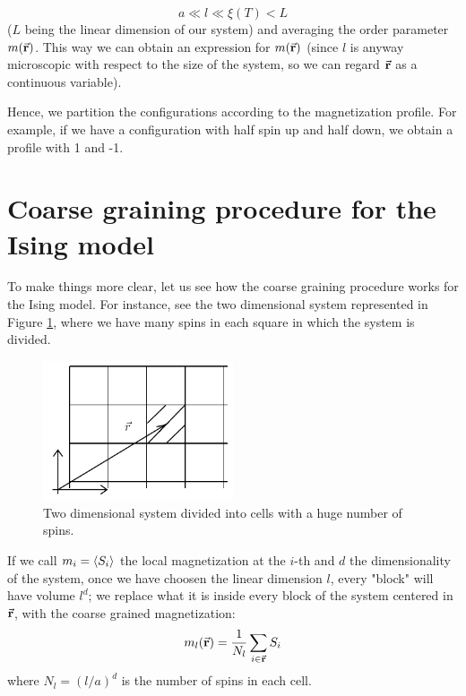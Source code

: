 \documentclass[../../Main/Main.tex]{subfiles}
\begin{document}
\begin{equation}
  a \ll l \ll \xi (T) < L
  \label{eq:17_1}
\end{equation}
(\( L \)  being the linear dimension of our system) and averaging the order parameter  \( m(\va{r}) \).  This way we can obtain an expression for \( m(\va{r}) \) (since \( l \) is anyway microscopic with respect to the size of the system, so we can regard  \( \va{r} \) as a continuous variable).

\begin{remark}
Hence, we partition the configurations according to the magnetization profile. For example, if we have a configuration with half spin up and half down, we obtain a profile with 1 and -1.
\end{remark}

\section{Coarse graining procedure for the Ising model}
To make things more clear, let us see how the coarse graining procedure works for the Ising model. For instance, see the two dimensional system represented in Figure \ref{fig:17_1}, where we have many spins in each square in which the system is divided.

\begin{figure}[H]
\centering
\includegraphics[width=0.5\textwidth]{./img/1.pdf}
\caption{\label{fig:17_1} Two dimensional system divided into cells with a huge number of spins.}
\end{figure}

If we call \( m_i = \expval{S_i}  \) the local magnetization at the \( i \)-th  and \( d \) the dimensionality of the system, once we have choosen the linear dimension \( l \), every "block" will have volume \( l^d \); we replace what it is inside every block of the system centered in \( \va{r} \), with the coarse grained magnetization:
\begin{equation}
  m_l (\va{r}) = \frac{1}{N_l} \sum_{i \in \va{r}}^{} S_i
\end{equation}
where \( N_l = (l/a)^d \) is the number of spins in each cell.
\end{document}
